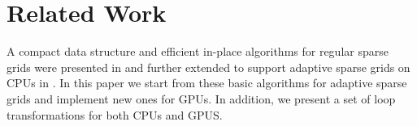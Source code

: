 \section{Related Work}
A compact data structure and efficient in-place algorithms for regular sparse
grids were presented in \cite{murarasu2011} and further extended to support
adaptive sparse grids on CPUs in \cite{murarasu2012}. In this paper we start
from these basic algorithms for adaptive sparse grids and implement new ones for
GPUs. In addition, we present a set of loop transformations for both CPUs and
GPUS.


